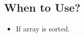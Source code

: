 \subsection{When to Use?}
\begin{summary}
    \begin{itemize}
        \item If array is sorted. 
    \end{itemize}
\end{summary}